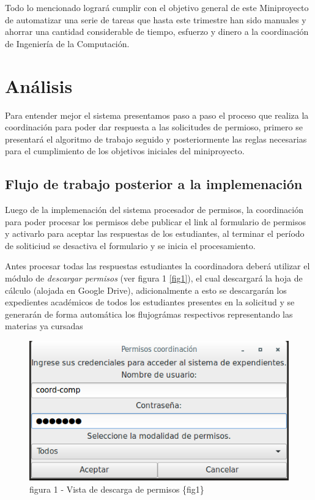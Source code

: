 \documentclass[]{article}
\begin{document}
Todo lo mencionado logrará cumplir con el objetivo general de este
Miniproyecto de automatizar una serie de tareas que hasta este trimestre
han sido manuales y ahorrar una cantidad considerable de tiempo,
esfuerzo y dinero a la coordinación de Ingeniería de la Computación.

\section{Análisis}\label{anuxe1lisis}

Para entender mejor el sistema presentamos paso a paso el proceso que
realiza la coordinación para poder dar respuesta a las solicitudes de
permioso, primero se presentará el algoritmo de trabajo seguido y
posteriormente las reglas necesarias para el cumplimiento de los
objetivos iniciales del miniproyecto.

\subsection{Flujo de trabajo posterior a la
implemenación}\label{flujo-de-trabajo-posterior-a-la-implemenaciuxf3n}

Luego de la implemenación del sistema procesador de permisos, la
coordinación para poder procesar los permisos debe publicar el link al
formulario de permisos y activarlo para aceptar las respuestas de los
estudiantes, al terminar el período de soliticiud se desactiva el
formulario y se inicia el procesamiento.

Antes procesar todas las respuestas estudiantes la coordinadora deberá
utilizar el módulo de \emph{descargar permisos} (ver figura 1
\ref{fig1}), el cual descargará la hoja de cálculo (alojada en Google
Drive), adicionalmente a esto se descargarán los expedientes académicos
de todos los estudiantes presentes en la solicitud y se generarán de
forma automática los flujográmas respectivos representando las materias
ya cursadas

\begin{figure}[htbp]
\centering
\includegraphics{descarga.png}
\caption{figura 1 - Vista de descarga de permisos \{fig1\}}
\end{figure}
\end{document}

